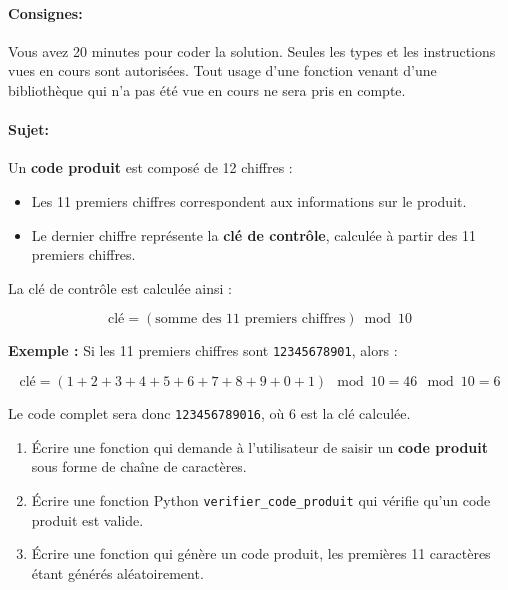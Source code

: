 \documentclass[a4paper,11pt]{article}
\begin{document}
\paragraph*{Consignes:} Vous avez 20 minutes pour coder la solution. Seules les types et les instructions vues en cours sont autorisées. Tout usage d'une fonction 
venant d'une bibliothèque qui n'a pas été vue en cours ne sera pris en compte. 

\vspace{-0.2 cm}
\paragraph*{Sujet:}

Un \textbf{code produit} est composé de 12 chiffres : 
\vspace{-0.2 cm}
\begin{itemize}
    \item Les 11 premiers chiffres correspondent aux informations sur le produit.
    \item Le dernier chiffre représente la \textbf{clé de contrôle}, calculée à partir des 11 premiers chiffres.
\end{itemize}
\vspace{-0.2 cm}
La clé de contrôle est calculée ainsi :
\vspace{-0.2 cm}

\[
\text{clé} = (\text{somme des 11 premiers chiffres}) \bmod 10
\]
\vspace{-0.2 cm}

\textbf{Exemple :}  
Si les 11 premiers chiffres sont \texttt{12345678901}, alors :  
\vspace{-0.2 cm}

\[
\text{clé} = (1+2+3+4+5+6+7+8+9+0+1) \mod 10 = 46 \mod 10 = 6
\]
\vspace{-0.3 cm}

Le code complet sera donc \texttt{123456789016}, où 6 est la clé calculée.

\vspace{-0.3 cm}


\begin{enumerate}
  \item[1.] Écrire une fonction qui demande à l'utilisateur de saisir un \textbf{code produit} sous forme de chaîne de caractères.
 \item[2.] Écrire une fonction Python  \texttt{verifier\_code\_produit}  qui vérifie qu'un code produit est valide. 
 \item[3.] \'Ecrire une fonction qui génère un code produit,  les premières 11 caractères étant générés aléatoirement. 
 \end{enumerate}
 \vspace{-0.2 cm}
\end{document}
